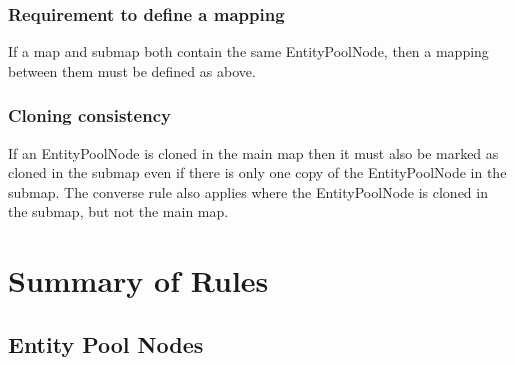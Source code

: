 \subsubsection{Requirement to define a mapping}

If a map and submap both contain the same EntityPoolNode, then a
mapping between them must be defined as above.

\subsubsection{Cloning consistency}

If an EntityPoolNode is cloned in the main map then it must also be
marked as cloned in the submap even if there is only one copy of the
EntityPoolNode in the submap. The converse rule also applies where the
EntityPoolNode is cloned in the submap, but not the main map.

\section{Summary of Rules}

\subsection{Entity Pool Nodes}

